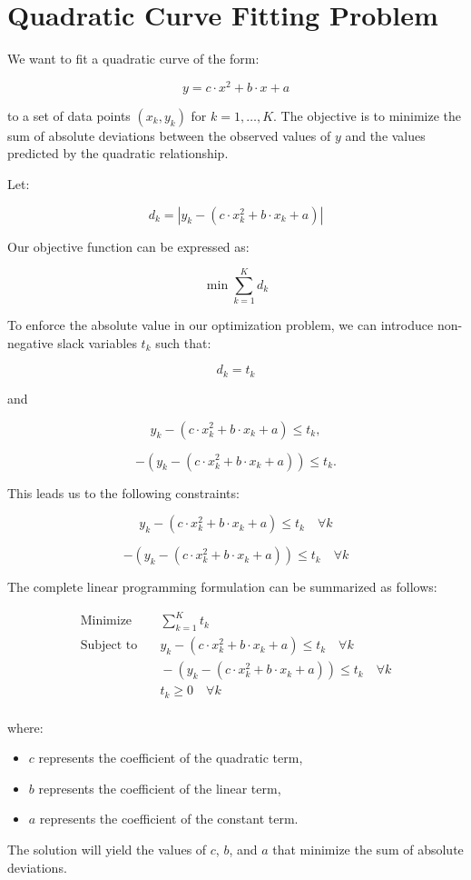 \documentclass{article}
\begin{document}
\section*{Quadratic Curve Fitting Problem}

We want to fit a quadratic curve of the form:

\[
y = c \cdot x^2 + b \cdot x + a
\]

to a set of data points \((x_k, y_k)\) for \(k = 1, \ldots, K\). The objective is to minimize the sum of absolute deviations between the observed values of \(y\) and the values predicted by the quadratic relationship.

Let:

\[
d_k = |y_k - (c \cdot x_k^2 + b \cdot x_k + a)|
\]

Our objective function can be expressed as:

\[
\min \sum_{k=1}^{K} d_k
\]

To enforce the absolute value in our optimization problem, we can introduce non-negative slack variables \(t_k\) such that:

\[
d_k = t_k
\]

and

\[
y_k - (c \cdot x_k^2 + b \cdot x_k + a) \leq t_k,
\]

\[
-(y_k - (c \cdot x_k^2 + b \cdot x_k + a)) \leq t_k.
\]

This leads us to the following constraints:

\[
y_k - (c \cdot x_k^2 + b \cdot x_k + a) \leq t_k \quad \forall k
\]

\[
-(y_k - (c \cdot x_k^2 + b \cdot x_k + a)) \leq t_k \quad \forall k
\]

The complete linear programming formulation can be summarized as follows:

\begin{align*}
\text{Minimize} & \quad \sum_{k=1}^{K} t_k \\
\text{Subject to} & \quad y_k - (c \cdot x_k^2 + b \cdot x_k + a) \leq t_k \quad \forall k \\
& \quad -(y_k - (c \cdot x_k^2 + b \cdot x_k + a)) \leq t_k \quad \forall k \\
& \quad t_k \geq 0 \quad \forall k \\
\end{align*}

\noindent where:

\begin{itemize}
    \item \(c\) represents the coefficient of the quadratic term,
    \item \(b\) represents the coefficient of the linear term,
    \item \(a\) represents the coefficient of the constant term.
\end{itemize}

The solution will yield the values of \(c\), \(b\), and \(a\) that minimize the sum of absolute deviations.
\end{document}
